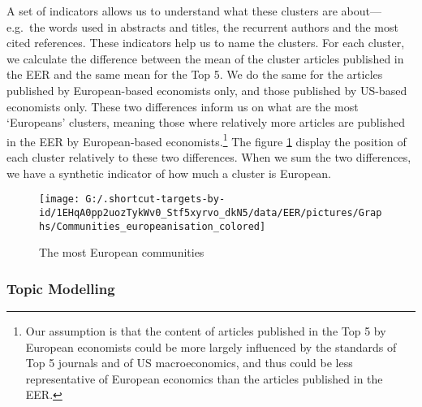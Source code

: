 \documentclass[]{elsarticle} %
\begin{document}
A set of indicators allows us to understand what these clusters are
about---e.g.~the words used in abstracts and titles, the recurrent
authors and the most cited references. These indicators help us to name
the clusters. For each cluster, we calculate the difference between the
mean of the cluster articles published in the EER and the same mean for
the Top 5. We do the same for the articles published by European-based
economists only, and those published by US-based economists only. These
two differences inform us on what are the most `Europeans' clusters,
meaning those where relatively more articles are published in the EER by
European-based economists.\footnote{Our assumption is that the content
  of articles published in the Top 5 by European economists could be
  more largely influenced by the standards of Top 5 journals and of US
  macroeconomics, and thus could be less representative of European
  economics than the articles published in the EER.} The figure
\ref{fig:plot-community-diff} display the position of each cluster
relatively to these two differences. When we sum the two differences, we
have a synthetic indicator of how much a cluster is European.

\begin{figure}[h]

{\centering \texttt{[image: G:/.shortcut-targets-by-id/1EHqA0pp2uozTykWv0\_Stf5xyrvo\_dkN5/data/EER/pictures/Graphs/Communities\_europeanisation\_colored]} 

}

\caption{The most European communities}\label{fig:plot-community-diff}
\end{figure}

\hypertarget{topic-modelling}{%
\subsubsection{Topic Modelling}\label{topic-modelling}}
\end{document}
